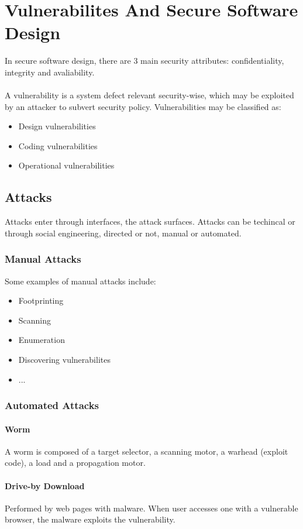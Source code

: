 \documentclass[10pt,a4paper]{report}
\begin{document}
\chapter{Vulnerabilites And Secure Software Design}
In secure software design, there are 3 main security attributes: confidentiality, integrity and avaliability.\\
\\
A vulnerability is a system defect relevant security-wise, which may be exploited by an attacker to subvert security policy. Vulnerabilities may be classified as:
\begin{itemize}
\item Design vulnerabilities
\item Coding vulnerabilities
\item Operational vulnerabilities
\end{itemize}
\section{Attacks}
Attacks enter through interfaces, the attack surfaces. Attacks can be techincal or through social engineering, directed or not, manual or automated.
\subsection{Manual Attacks}
Some examples of manual attacks include:
\begin{itemize}
\item Footprinting
\item Scanning
\item Enumeration
\item Discovering vulnerabilites
\item ...
\end{itemize}
\subsection{Automated Attacks}
\subsubsection{Worm}
A worm is composed of a target selector, a scanning motor, a warhead (exploit code), a load and a propagation motor.
\subsubsection{Drive-by Download}
Performed by web pages with malware. When user accesses one with a vulnerable browser, the malware exploits the vulnerability.
\end{document}
